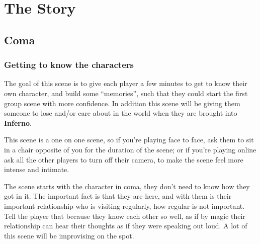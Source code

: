 \section{The Story}%
\label{sec:the_story}

\subsection{Coma}%
\label{sub:coma}

\subsubsection{Getting to know the characters}%
\label{ssub:getting_to_know_the_characters}

The goal of this scene is to give each player a few minutes to get to know their own character, and build some “memories”, such
that they could start the first group scene with more confidence.  In addition this scene will be giving them someone to lose
and/or care about in the world when they are brought into \textbf{Inferno}.

This scene is a one on one scene, so if you're playing face to face, ask them to sit in a chair opposite of you for the
duration of the scene; or if you're playing online ask all the other players to turn off their camera, to make the scene feel
more intense and intimate.

The scene starts with the character in coma, they don't need to know how they got in it.  The important fact is that they are
here, and with them is their important relationship who is visiting regularly, how regular is not important.  Tell the player
that because they know each other so well, as if by magic their relationship can hear their thoughts as if they were speaking
out loud.  A lot of this scene will be improvising on the spot.

